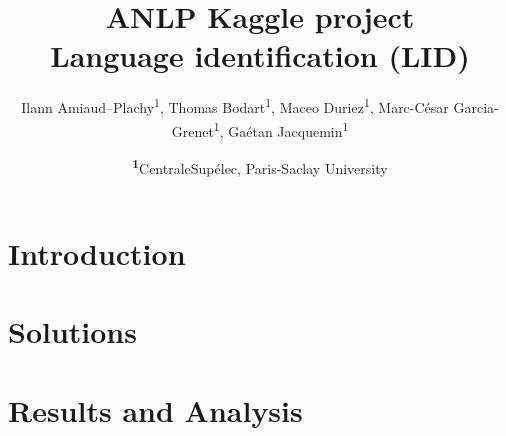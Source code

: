 \documentclass[
	a4paper, %
	10pt, %
	unnumberedsections, %
	twoside, %
]{LTJournalArticle}
\title{ANLP Kaggle project\\ \LARGE Language identification (LID)} %
\author{%
    Ilann Amiaud--Plachy\textsuperscript{1},
    Thomas Bodart\textsuperscript{1},
    Maceo Duriez\textsuperscript{1},
    Marc-César Garcia-Grenet\textsuperscript{1},
    Gaétan Jacquemin\textsuperscript{1}
}
\date{\footnotesize\textsuperscript{\textbf{1}}CentraleSupélec, Paris-Saclay University}
\begin{document}
\maketitle %


\section{Introduction}

    

\section{Solutions}

    

\section{Results and Analysis}

    


    \printbibliography
\end{document}
